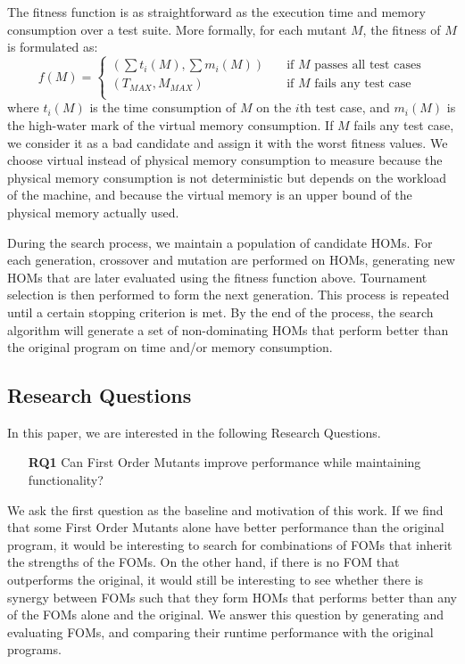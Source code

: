 \documentclass[oribibl]{llncs}
\begin{document}
The fitness function is as straightforward as the execution time and memory consumption over a test suite.
More formally, for each mutant $M$, the fitness of $M$ is formulated as:
$$f(M)=
\begin{cases}
    (\sum t_i(M), \sum m_i(M))       & \quad \text{if } M \text{ passes all test cases}\\
    (T_{MAX}, M_{MAX})  & \quad \text{if } M \text{ fails any test case}\\
\end{cases}
$$
where $t_i(M)$ is the time consumption of $M$ on the $i$th test case, and $m_i(M)$ is the high-water mark of the virtual memory consumption.
If $M$ fails any test case, we consider it as a bad candidate and assign it with the worst fitness values.
We choose virtual instead of physical memory consumption to measure because the physical memory consumption is not deterministic but depends on the workload of the machine, and because the virtual memory is an upper bound of the physical memory actually used.

During the search process, we maintain a population of candidate HOMs.
For each generation, crossover and mutation are performed on HOMs, generating new HOMs that are later evaluated using the fitness function above.
Tournament selection is then performed to form the next generation.
This process is repeated until a certain stopping criterion is met.
By the end of the process, the search algorithm will generate a set of non-dominating HOMs that perform better than the original program on time and/or memory consumption.

\subsection{Research Questions}
\label{sec_rq}

In this paper, we are interested in the following Research Questions.

\begin{enumerate}
\item[\textbf{RQ1}] Can First Order Mutants improve performance while maintaining functionality?
\end{enumerate}

We ask the first question as the baseline and motivation of this work.
If we find that some First Order Mutants alone have better performance than the original program, it would be interesting to search for combinations of FOMs that inherit the strengths of the FOMs.
On the other hand, if there is no FOM that outperforms the original, it would still be interesting to see whether there is synergy between FOMs such that they form HOMs that performs better than any of the FOMs alone and the original.
We answer this question by generating and evaluating FOMs, and comparing their runtime performance with the original programs.
\end{document}
